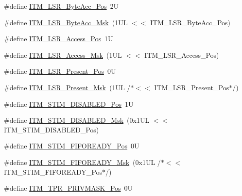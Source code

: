\begin{DoxyCompactItemize}
\item 
\#define \mbox{\hyperlink{group___c_m_s_i_s___i_t_m_gabfae3e570edc8759597311ed6dfb478e}{I\+T\+M\+\_\+\+L\+S\+R\+\_\+\+Byte\+Acc\+\_\+\+Pos}}~2U
\item 
\#define \mbox{\hyperlink{group___c_m_s_i_s___i_t_m_ga91f492b2891bb8b7eac5b58de7b220f4}{I\+T\+M\+\_\+\+L\+S\+R\+\_\+\+Byte\+Acc\+\_\+\+Msk}}~(1\+U\+L $<$$<$ I\+T\+M\+\_\+\+L\+S\+R\+\_\+\+Byte\+Acc\+\_\+\+Pos)
\item 
\#define \mbox{\hyperlink{group___c_m_s_i_s___i_t_m_ga144a49e12b83ad9809fdd2769094fdc0}{I\+T\+M\+\_\+\+L\+S\+R\+\_\+\+Access\+\_\+\+Pos}}~1U
\item 
\#define \mbox{\hyperlink{group___c_m_s_i_s___i_t_m_gac8ae69f11c0311da226c0c8ec40b3d37}{I\+T\+M\+\_\+\+L\+S\+R\+\_\+\+Access\+\_\+\+Msk}}~(1\+U\+L $<$$<$ I\+T\+M\+\_\+\+L\+S\+R\+\_\+\+Access\+\_\+\+Pos)
\item 
\#define \mbox{\hyperlink{group___c_m_s_i_s___i_t_m_gaf5740689cf14564d3f3fd91299b6c88d}{I\+T\+M\+\_\+\+L\+S\+R\+\_\+\+Present\+\_\+\+Pos}}~0U
\item 
\#define \mbox{\hyperlink{group___c_m_s_i_s___i_t_m_gaa5bc2a7f5f1d69ff819531f5508bb017}{I\+T\+M\+\_\+\+L\+S\+R\+\_\+\+Present\+\_\+\+Msk}}~(1\+U\+L /$\ast$$<$$<$ I\+T\+M\+\_\+\+L\+S\+R\+\_\+\+Present\+\_\+\+Pos$\ast$/)
\item 
\#define \mbox{\hyperlink{group___c_m_s_i_s___i_t_m_gafd9ed85f36233685f182cc249621e025}{I\+T\+M\+\_\+\+S\+T\+I\+M\+\_\+\+D\+I\+S\+A\+B\+L\+E\+D\+\_\+\+Pos}}~1U
\item 
\#define \mbox{\hyperlink{group___c_m_s_i_s___i_t_m_ga9d8f821bdad48c7b4a02f11ebf2c8852}{I\+T\+M\+\_\+\+S\+T\+I\+M\+\_\+\+D\+I\+S\+A\+B\+L\+E\+D\+\_\+\+Msk}}~(0x1\+U\+L $<$$<$ I\+T\+M\+\_\+\+S\+T\+I\+M\+\_\+\+D\+I\+S\+A\+B\+L\+E\+D\+\_\+\+Pos)
\item 
\#define \mbox{\hyperlink{group___c_m_s_i_s___i_t_m_gaa79f3a59d15d810d48d924c0ca4ae0b9}{I\+T\+M\+\_\+\+S\+T\+I\+M\+\_\+\+F\+I\+F\+O\+R\+E\+A\+D\+Y\+\_\+\+Pos}}~0U
\item 
\#define \mbox{\hyperlink{group___c_m_s_i_s___i_t_m_ga73dc88e3338b4ef9a81e53a1d2c5ae83}{I\+T\+M\+\_\+\+S\+T\+I\+M\+\_\+\+F\+I\+F\+O\+R\+E\+A\+D\+Y\+\_\+\+Msk}}~(0x1\+U\+L /$\ast$$<$$<$ I\+T\+M\+\_\+\+S\+T\+I\+M\+\_\+\+F\+I\+F\+O\+R\+E\+A\+D\+Y\+\_\+\+Pos$\ast$/)
\item 
\#define \mbox{\hyperlink{group___c_m_s_i_s___i_t_m_ga7abe5e590d1611599df87a1884a352e8}{I\+T\+M\+\_\+\+T\+P\+R\+\_\+\+P\+R\+I\+V\+M\+A\+S\+K\+\_\+\+Pos}}~0U
\item 
$$
\end{DoxyCompactItemize}
